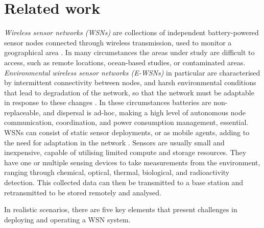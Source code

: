 \section{Related work}
\label{section:background}
\textit{Wireless sensor networks (WSNs)} are collections of independent battery-powered sensor nodes connected through wireless transmission, used to monitor a geographical area \citep{Akyildiz,Yick2008a}. In many circumstances the areas under study are difficult to access, such as remote locations, ocean-based studies, or contaminated areas. \textit{Environmental wireless sensor networks (E-WSNs)} in particular are characterised by intermittent connectivity between nodes, and harsh environmental conditions that lead to degradation of the network, so that the network must be adaptable in response to these changes \citep{Oliveira2011}. In these circumstances batteries are non-replaceable, and dispersal is ad-hoc, making a high level of autonomous node communication, coordination, and power consumption management, essential. WSNs can consist of static sensor deployments, or as mobile agents, adding to the need for adaptation in the network \citep{ramasamy2017mobile, 4224091}. Sensors are usually small and inexpensive, capable of utilising limited compute and storage resources. They have one or multiple sensing devices to take measurements from the environment, ranging through chemical, optical, thermal, biological, and radioactivity detection. This collected data can then be transmitted to a base station and retransmitted to be stored remotely and analysed.

In realistic scenarios, there are five key elements that present challenges in deploying and operating a WSN system.

